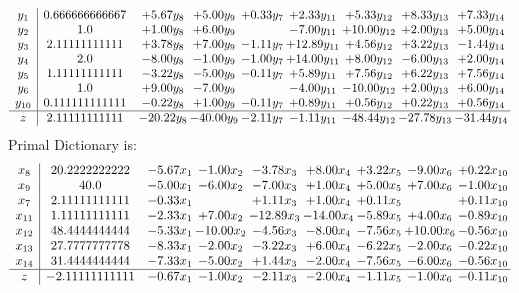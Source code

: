 \documentclass[8pt]{article}
\begin{document}
\[\begin{array}{c| c c@{\hskip 2pt} c@{\hskip 2pt} c@{\hskip 2pt} c@{\hskip 2pt} c@{\hskip 2pt} c@{\hskip 2pt} c@{\hskip 2pt} }
 y_{1}   &  0.666666666667 & +  5.67 y_{8} & +  5.00 y_{9} & +  0.33 y_{7} & +  2.33 y_{11} & +  5.33 y_{12} & +  8.33 y_{13} & +  7.33 y_{14}\\
 y_{2}   &  1.0 & +  1.00 y_{8} & +  6.00 y_{9} &   & -7.00 y_{11} & + 10.00 y_{12} & +  2.00 y_{13} & +  5.00 y_{14}\\
 y_{3}   &  2.11111111111 & +  3.78 y_{8} & +  7.00 y_{9} & -1.11 y_{7} & + 12.89 y_{11} & +  4.56 y_{12} & +  3.22 y_{13} & -1.44 y_{14}\\
 y_{4}   &  2.0 & -8.00 y_{8} & -1.00 y_{9} & -1.00 y_{7} & + 14.00 y_{11} & +  8.00 y_{12} & -6.00 y_{13} & +  2.00 y_{14}\\
 y_{5}   &  1.11111111111 & -3.22 y_{8} & -5.00 y_{9} & -0.11 y_{7} & +  5.89 y_{11} & +  7.56 y_{12} & +  6.22 y_{13} & +  7.56 y_{14}\\
 y_{6}   &  1.0 & +  9.00 y_{8} & -7.00 y_{9} &   & -4.00 y_{11} & -10.00 y_{12} & +  2.00 y_{13} & +  6.00 y_{14}\\
 y_{10}   &  0.111111111111 & -0.22 y_{8} & +  1.00 y_{9} & -0.11 y_{7} & +  0.89 y_{11} & +  0.56 y_{12} & +  0.22 y_{13} & +  0.56 y_{14}\\
\hline
z    &  2.11111111111 & -20.22 y_{8} & -40.00 y_{9} & -2.11 y_{7} & -1.11 y_{11} & -48.44 y_{12} & -27.78 y_{13} & -31.44 y_{14}\\
\end{array}\]
Primal Dictionary is:
\[\begin{array}{c| c c@{\hskip 2pt} c@{\hskip 2pt} c@{\hskip 2pt} c@{\hskip 2pt} c@{\hskip 2pt} c@{\hskip 2pt} c@{\hskip 2pt} }
 x_{8}   &  20.2222222222 & -5.67 x_{1} & -1.00 x_{2} & -3.78 x_{3} & +  8.00 x_{4} & +  3.22 x_{5} & -9.00 x_{6} & +  0.22 x_{10}\\
 x_{9}   &  40.0 & -5.00 x_{1} & -6.00 x_{2} & -7.00 x_{3} & +  1.00 x_{4} & +  5.00 x_{5} & +  7.00 x_{6} & -1.00 x_{10}\\
 x_{7}   &  2.11111111111 & -0.33 x_{1} &   & +  1.11 x_{3} & +  1.00 x_{4} & +  0.11 x_{5} &   & +  0.11 x_{10}\\
 x_{11}   &  1.11111111111 & -2.33 x_{1} & +  7.00 x_{2} & -12.89 x_{3} & -14.00 x_{4} & -5.89 x_{5} & +  4.00 x_{6} & -0.89 x_{10}\\
 x_{12}   &  48.4444444444 & -5.33 x_{1} & -10.00 x_{2} & -4.56 x_{3} & -8.00 x_{4} & -7.56 x_{5} & + 10.00 x_{6} & -0.56 x_{10}\\
 x_{13}   &  27.7777777778 & -8.33 x_{1} & -2.00 x_{2} & -3.22 x_{3} & +  6.00 x_{4} & -6.22 x_{5} & -2.00 x_{6} & -0.22 x_{10}\\
 x_{14}   &  31.4444444444 & -7.33 x_{1} & -5.00 x_{2} & +  1.44 x_{3} & -2.00 x_{4} & -7.56 x_{5} & -6.00 x_{6} & -0.56 x_{10}\\
\hline
z    &  -2.11111111111 & -0.67 x_{1} & -1.00 x_{2} & -2.11 x_{3} & -2.00 x_{4} & -1.11 x_{5} & -1.00 x_{6} & -0.11 x_{10}\\
\end{array}\]
\end{document}
